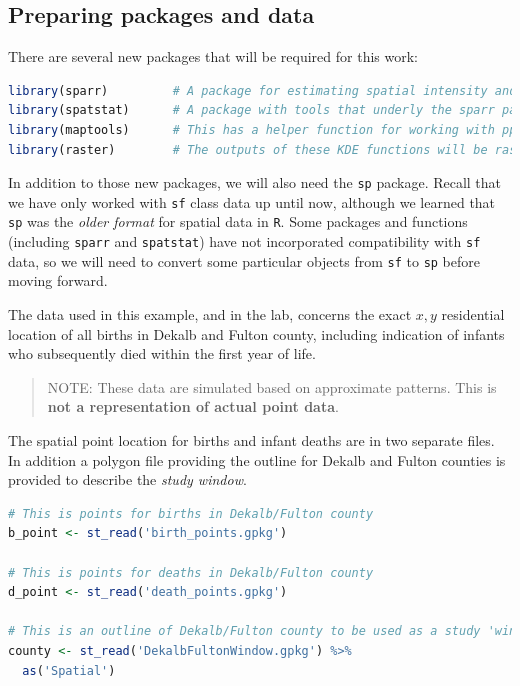 \documentclass[
]{book}
\newcommand{\passthrough}[1]{#1}
\begin{document}
\hypertarget{preparing-packages-and-data}{%
\subsection{Preparing packages and data}\label{preparing-packages-and-data}}

There are several new packages that will be required for this work:

\begin{lstlisting}[language=R]
library(sparr)         # A package for estimating spatial intensity and relative risk
library(spatstat)      # A package with tools that underly the sparr package
library(maptools)      # This has a helper function for working with ppp class data
library(raster)        # The outputs of these KDE functions will be raster. This package gives us tools for working with rasters
\end{lstlisting}

In addition to those new packages, we will also need the \passthrough{\lstinline!sp!} package. Recall that we have only worked with \passthrough{\lstinline!sf!} class data up until now, although we learned that \passthrough{\lstinline!sp!} was the \emph{older format} for spatial data in \passthrough{\lstinline!R!}. Some packages and functions (including \passthrough{\lstinline!sparr!} and \passthrough{\lstinline!spatstat!}) have not incorporated compatibility with \passthrough{\lstinline!sf!} data, so we will need to convert some particular objects from \passthrough{\lstinline!sf!} to \passthrough{\lstinline!sp!} before moving forward.

The data used in this example, and in the lab, concerns the exact \(x,y\) residential location of all births in Dekalb and Fulton county, including indication of infants who subsequently died within the first year of life.

\begin{quote}
NOTE: These data are simulated based on approximate patterns. This is \textbf{not a representation of actual point data}.
\end{quote}

The spatial point location for births and infant deaths are in two separate files. In addition a polygon file providing the outline for Dekalb and Fulton counties is provided to describe the \emph{study window}.

\begin{lstlisting}[language=R]
# This is points for births in Dekalb/Fulton county
b_point <- st_read('birth_points.gpkg')

# This is points for deaths in Dekalb/Fulton county
d_point <- st_read('death_points.gpkg') 

# This is an outline of Dekalb/Fulton county to be used as a study 'window'
county <- st_read('DekalbFultonWindow.gpkg') %>%
  as('Spatial')
\end{lstlisting}
\end{document}
